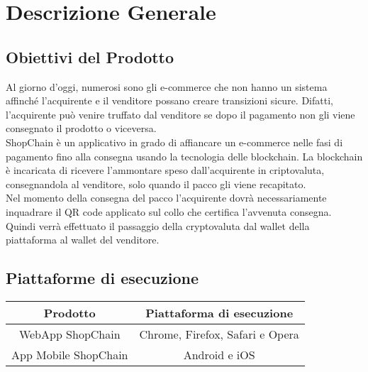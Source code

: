 \section{Descrizione Generale}
\subsection{Obiettivi del Prodotto}
Al giorno d’oggi, numerosi sono gli e-commerce che non hanno un sistema affinché l’acquirente e il venditore possano creare transizioni sicure. Difatti, l’acquirente può venire truffato dal venditore se dopo il pagamento non gli viene consegnato il prodotto o viceversa. 
\\
ShopChain è un applicativo in grado di affiancare un e-commerce nelle fasi di pagamento fino alla consegna usando la tecnologia delle blockchain. La blockchain è incaricata di ricevere l’ammontare speso dall’acquirente in criptovaluta, consegnandola al venditore, solo quando il pacco gli viene recapitato. 
\\
Nel momento della consegna del pacco l’acquirente dovrà necessariamente inquadrare il QR code applicato sul collo che certifica l’avvenuta consegna. Quindi verrà effettuato il passaggio della cryptovaluta dal wallet della piattaforma al wallet del venditore.
 
\subsection{Piattaforme di esecuzione}
\renewcommand{\arraystretch}{1.5}
\begin{center}
    \begin{tabular}{|c|c|}
        \hline
             \textbf{}Prodotto  &  \textbf{}Piattaforma di esecuzione \\
             \hline
             WebApp ShopChain  & Chrome, Firefox, Safari e Opera \\
             \hline
             App Mobile ShopChain & Android e iOS \\
        \hline
    \end{tabular}
\end{center}

